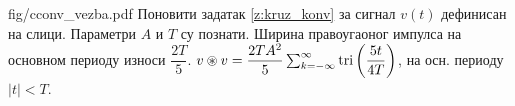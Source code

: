 \begin{slikaDesno}{fig/cconv_vezba.pdf}
    \PID 
    Поновити задатак \ref{z:kruz_konv} за сигнал $v(t)$ дефинисан на слици. 
    Параметри $A$ и $T$ су познати. Ширина правоугаоног импулса на 
    основном периоду износи $\dfrac{2T}{5}$.
    \REZULTAT 
    $v \circledast v = \dfrac{2TA^2}{5}\sum_{k=-\infty}^{\infty} 
    {\rm tri}\left( 
    \dfrac{5t}{4T}
    \right)$, на осн. периоду $|t| < T$.
\end{slikaDesno} \\
\vspace*{2mm}

